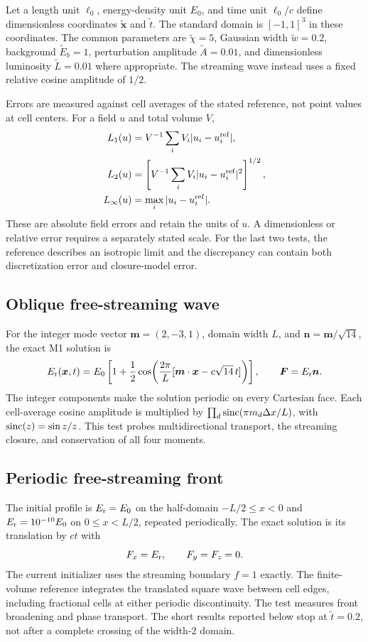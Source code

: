 \documentclass[manuscript]{aastex7}
\newcommand{\vct}[1]{\boldsymbol{#1}}
\newcommand{\Er}{E_{\rm r}}
\newcommand{\Fr}{\vct{F}}
\newcommand{\dx}{\Delta x}
\begin{document}
Let a length unit $\ell_0$, energy-density unit $E_0$, and time unit
$\ell_0/c$ define dimensionless coordinates $\tilde{\vct{x}}$ and
$\tilde t$. The standard domain is $[-1,1]^3$ in these coordinates.
The common parameters are $\tilde\chi=5$, Gaussian width
$\tilde w=0.2$, background $\tilde E_b=1$, perturbation amplitude
$\tilde A=0.01$, and dimensionless luminosity
$\tilde L=0.01$ where appropriate. The streaming wave instead uses a
fixed relative cosine amplitude of $1/2$.

Errors are measured against cell averages of the stated reference,
not point values at cell centers. For a field $u$ and total volume $V$,
\begin{align}
 L_1(u)&=V^{-1}\sum_i V_i|u_i-u_i^{\rm ref}|,\\
 L_2(u)&=\left[V^{-1}\sum_i V_i|u_i-u_i^{\rm ref}|^2\right]^{1/2},\\
 L_\infty(u)&=\max_i|u_i-u_i^{\rm ref}|.
 \label{eq:norms}
\end{align}
These are absolute field errors and retain the units of $u$. A
dimensionless or relative error requires a separately stated scale.
For the last two tests, the reference describes an isotropic limit and
the discrepancy can contain both discretization error and closure-model
error.

\subsection{Oblique free-streaming wave}
For the integer mode vector $\vct{m}=(2,-3,1)$, domain width $L$, and
$\vct{n}=\vct{m}/\sqrt{14}$, the exact M1 solution is
\begin{equation}
 \Er(\vct{x},t)=E_0\left[1+\frac12
 \cos\!\left(\frac{2\pi}{L}
 [\vct{m}\cdot\vct{x}-c\sqrt{14}\,t]\right)\right],
 \qquad \Fr=\Er\vct{n}.
 \label{eq:wave}
\end{equation}
The integer components make the solution periodic on every Cartesian
face. Each cell-average cosine amplitude is multiplied by
$\prod_d{\rm sinc}(\pi m_d\dx/L)$, with
${\rm sinc}(z)=\sin z/z$. This test probes multidirectional transport,
the streaming closure, and conservation of all four moments.

\subsection{Periodic free-streaming front}
The initial profile is $\Er=E_0$ on the half-domain $-L/2\leq x<0$
and $\Er=10^{-10}E_0$ on $0\leq x<L/2$, repeated periodically.
The exact solution is its translation by $ct$ with
\begin{equation}
 F_x=\Er,\qquad F_y=F_z=0.
\end{equation}
The current initializer uses the streaming boundary $f=1$ exactly.
The finite-volume reference integrates the translated square wave
between cell edges, including fractional cells at either periodic
discontinuity. The test measures front broadening and phase transport.
The short results reported below stop at $\tilde t=0.2$, not after a
complete crossing of the width-$2$ domain.
\end{document}
